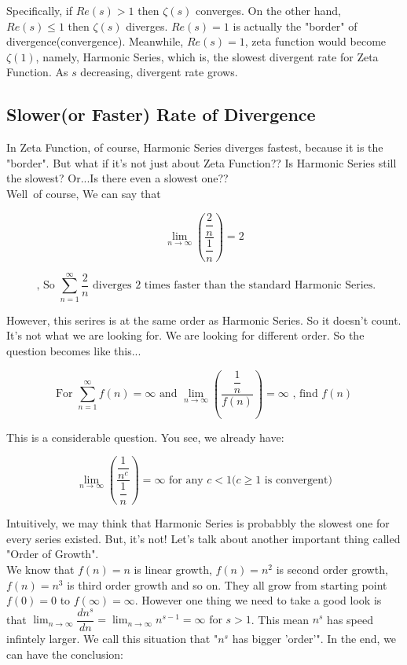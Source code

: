 \documentclass{article}
\begin{document}
  Specifically, if $Re(s) > 1$ then $\zeta(s)$ converges. On the other hand, $Re(s) \leq 1$ then $\zeta(s)$ diverges. $Re(s) = 1$ is actually the "border" of divergence(convergence). Meanwhile, $Re(s) = 1$, zeta function would become $\zeta(1)$, namely, Harmonic Series, which is, the slowest divergent rate for Zeta Function. As $s$ decreasing, divergent rate grows. \\

  \subsection{Slower(or Faster) Rate of Divergence}
  In Zeta Function, of course, Harmonic Series diverges fastest, because it is the "border". But what if it's not just about Zeta Function?? Is Harmonic Series still the slowest? Or...Is there even a slowest one?? \\

  Well~of course, We can say that 

  \[
	  \displaystyle \lim_{n \to \infty} \left( \dfrac{\dfrac{2}{n}}{\dfrac{1}{n}} \right) = 2 
  \]

  \[
	  \text{ , So } \sum_{n=1}^{\infty}\dfrac{2}{n} \text{ diverges 2 times faster than the standard Harmonic Series.}
  \]

  However, this serires is at the same order as Harmonic Series. So it doesn't count. It's not what we are looking for. We are looking for different order. So the question becomes like this... 

  \[
	  \text{For }\displaystyle \sum_{n=1}^{\infty} f(n) = \infty \text{ and } \lim_{n \to \infty} \left( \dfrac{\dfrac{1}{n}}{f(n)} \right) = \infty \text{ , find } f(n) 
  \]

  This is a considerable question. You see, we already have:

  \[
	  \displaystyle \lim_{n \to \infty} \left( \dfrac{\dfrac{1}{n^c}}{\dfrac{1}{n}} \right) = \infty \text{ for any } c<1 \text{(} c\geq1 \text{ is convergent)}
  \]

  Intuitively, we may think that Harmonic Series is probabbly the slowest one for every series existed. But, it's not! Let's talk about another important thing called "Order of Growth". \\

  We know that $f(n) = n$ is linear growth, $f(n) = n^2$ is second order growth, $f(n) = n^3$ is third order growth and so on. They all grow from starting point $f(0) = 0$ to $f(\infty) = \infty$. However one thing we need to take a good look is that $\displaystyle \lim_{n \to \infty} \dfrac{dn^{s}}{dn} = \lim_{n \to \infty} n^{s-1}  = \infty \text{ for } s>1$. This mean $n^s$ has speed infintely larger.  We call this situation that "$n^{s}$ has bigger 'order'". In the end, we can have the conclusion:
\end{document}
